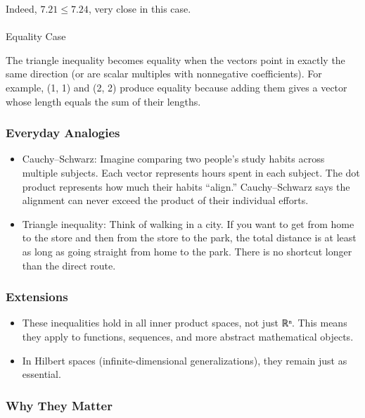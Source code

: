 \documentclass[
  letterpaper,
  DIV=11,
  numbers=noendperiod]{scrreprt}
\makeatletter
\let\oldparagraph\paragraph
\renewcommand{\paragraph}{
    \@ifstar
      \xxxParagraphStar
      \xxxParagraphNoStar
  }
\newcommand{\xxxParagraphStar}[1]{\oldparagraph*{#1}\mbox{}}
\newcommand{\xxxParagraphNoStar}[1]{\oldparagraph{#1}\mbox{}}
\providecommand{\tightlist}{%
  \setlength{\itemsep}{0pt}\setlength{\parskip}{0pt}}
\makeatother
\begin{document}
Indeed, \(7.21 \leq 7.24\), very close in this case.

\paragraph{Equality Case}\label{equality-case}

The triangle inequality becomes equality when the vectors point in
exactly the same direction (or are scalar multiples with nonnegative
coefficients). For example, (1, 1) and (2, 2) produce equality because
adding them gives a vector whose length equals the sum of their lengths.

\subsubsection{Everyday Analogies}\label{everyday-analogies-6}

\begin{itemize}
\tightlist
\item
  Cauchy--Schwarz: Imagine comparing two people's study habits across
  multiple subjects. Each vector represents hours spent in each subject.
  The dot product represents how much their habits ``align.''
  Cauchy--Schwarz says the alignment can never exceed the product of
  their individual efforts.
\item
  Triangle inequality: Think of walking in a city. If you want to get
  from home to the store and then from the store to the park, the total
  distance is at least as long as going straight from home to the park.
  There is no shortcut longer than the direct route.
\end{itemize}

\subsubsection{Extensions}\label{extensions}

\begin{itemize}
\tightlist
\item
  These inequalities hold in all inner product spaces, not just ℝⁿ. This
  means they apply to functions, sequences, and more abstract
  mathematical objects.
\item
  In Hilbert spaces (infinite-dimensional generalizations), they remain
  just as essential.
\end{itemize}

\subsubsection{Why They Matter}\label{why-they-matter}
\end{document}

